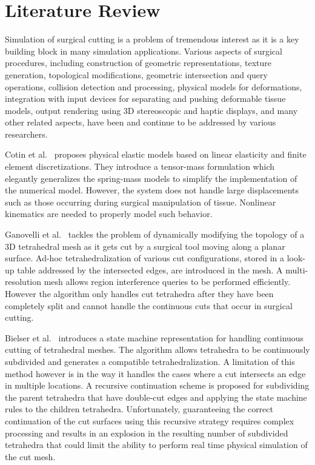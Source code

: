 
\chapter{Literature Review}\label{chp:literature}

Simulation of surgical cutting is a problem of tremendous interest as it is a key building block in many simulation applications. Various aspects of surgical procedures, including construction of geometric representations, texture generation, topological modifications, geometric intersection and query operations, collision detection and processing, physical models for deformations, integration with input devices for separating and pushing deformable tissue models, output rendering using 3D stereoscopic and haptic displays, and many other related aspects, have been and continue to be addressed by various researchers. 

Cotin et al.~\cite{cotin:tvc:2000} proposes physical elastic models based on linear elasticity and finite element discretizations. They introduce a tensor-mass formulation which elegantly generalizes the spring-mass models to simplify the implementation of the numerical model. However, the system does not handle large displacements such as those occurring during surgical manipulation of tissue. Nonlinear kinematics are needed to properly model such behavior.

Ganovelli et al.~\cite{ganovelli:tvc:2001} tackles the problem of dynamically modifying the topology of a 3D tetrahedral mesh as it gets cut by a surgical tool moving along a planar surface. Ad-hoc tetrahedralization of various cut configurations, stored in a look-up table addressed by the intersected edges, are introduced in the mesh. A multi-resolution mesh allows region interference queries to be performed efficiently. However the algorithm only handles cut tetrahedra after they have been completely split and cannot handle the continuous cuts that occur in surgical cutting. 

Bielser et al.~\cite{bielser:gm:2004} introduces a state machine representation for handling continuous cutting of tetrahedral meshes. The algorithm allows tetrahedra to be continuously subdivided and generates a compatible tetrahedralization. A limitation of this method however is in the way it handles the cases where a cut intersects an edge in multiple locations. A recursive continuation scheme is proposed for subdividing the parent tetrahedra that have double-cut edges and applying the state machine rules to the children tetrahedra. Unfortunately, guaranteeing the correct continuation of the cut surfaces using this recursive strategy requires complex processing and results in an explosion in the resulting number of subdivided tetrahedra that could limit the ability to perform real time physical simulation of the cut mesh. 

